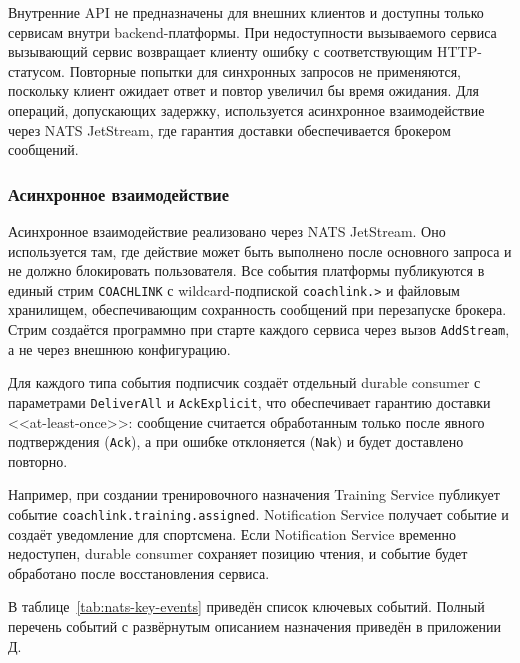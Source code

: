 Внутренние API не предназначены для внешних клиентов и доступны только сервисам внутри backend-платформы. При недоступности вызываемого сервиса вызывающий сервис возвращает клиенту ошибку с соответствующим HTTP-статусом. Повторные попытки для синхронных запросов не применяются, поскольку клиент ожидает ответ и повтор увеличил бы время ожидания. Для операций, допускающих задержку, используется асинхронное взаимодействие через NATS JetStream, где гарантия доставки обеспечивается брокером сообщений.

\subsubsection{Асинхронное взаимодействие}

Асинхронное взаимодействие реализовано через NATS JetStream. Оно используется там, где действие может быть выполнено после основного запроса и не должно блокировать пользователя. Все события платформы публикуются в единый стрим \passthrough{\lstinline!COACHLINK!} с wildcard-подпиской \passthrough{\lstinline!coachlink.>!} и файловым хранилищем, обеспечивающим сохранность сообщений при перезапуске брокера. Стрим создаётся программно при старте каждого сервиса через вызов \passthrough{\lstinline!AddStream!}, а не через внешнюю конфигурацию.

Для каждого типа события подписчик создаёт отдельный durable consumer с параметрами \passthrough{\lstinline!DeliverAll!} и \passthrough{\lstinline!AckExplicit!}, что обеспечивает гарантию доставки <<at-least-once>>: сообщение считается обработанным только после явного подтверждения (\passthrough{\lstinline!Ack!}), а при ошибке отклоняется (\passthrough{\lstinline!Nak!}) и будет доставлено повторно.

Например, при создании тренировочного назначения Training Service публикует событие \passthrough{\lstinline!coachlink.training.assigned!}. Notification Service получает событие и создаёт уведомление для спортсмена. Если Notification Service временно недоступен, durable consumer сохраняет позицию чтения, и событие будет обработано после восстановления сервиса.

В таблице~\ref{tab:nats-key-events} приведён список ключевых событий. Полный перечень событий с развёрнутым описанием назначения приведён в приложении Д.

